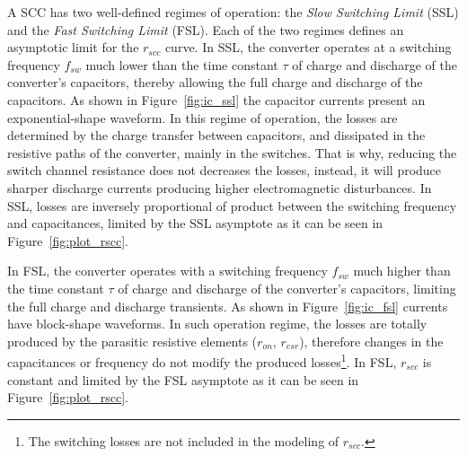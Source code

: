 A SCC has two well-defined regimes of operation: the \emph{Slow Switching Limit} (SSL) and the \emph{Fast Switching Limit} (FSL). Each of the two regimes defines an asymptotic limit for the $r_{scc}$ curve. In SSL, the converter operates at a switching frequency $f_{sw}$ much lower than the time constant $\tau$ of charge and discharge of the converter's capacitors, thereby allowing the full charge and discharge of the capacitors. As shown in Figure~\ref{fig:ic_ssl} the capacitor currents present an exponential-shape waveform. In this regime of operation, the losses are determined by the charge transfer between capacitors, and dissipated in the resistive paths of the converter, mainly in the switches. That is why, reducing the switch channel resistance does not decreases the losses, instead, it will produce sharper discharge currents producing higher electromagnetic disturbances. In SSL, losses are inversely proportional of product between the switching frequency and capacitances, limited by the SSL asymptote as it can be seen in Figure~\ref{fig:plot_rscc}.

In FSL, the converter operates with a switching frequency $f_{sw}$ much higher than the time constant $\tau$ of charge and discharge of the converter's capacitors, limiting the full charge and discharge transients. As shown in Figure~\ref{fig:ic_fsl} currents have block-shape waveforms. In such operation regime, the losses are totally produced by the parasitic resistive elements ($r_{on}$, $r_{esr}$), therefore changes in the capacitances or frequency do not modify the produced losses\footnote{The switching losses are not included in the modeling of $r_{scc}$. }. In FSL, $r_{scc}$ is constant and limited by the FSL asymptote as it can be seen in Figure~\ref{fig:plot_rscc}.

